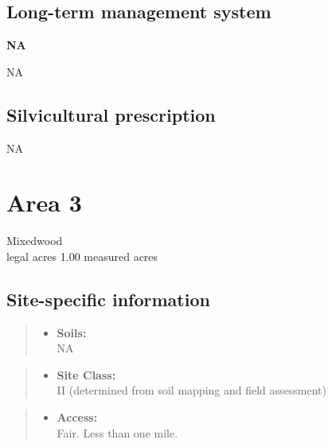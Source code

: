 \documentclass[]{tufte-handout}
\providecommand{\tightlist}{%
  \setlength{\itemsep}{0pt}\setlength{\parskip}{0pt}}
\begin{document}
\subsection{Long-term management
system}\label{long-term-management-system-1}

\textbf{NA}

NA

\subsection{Silvicultural
prescription}\label{silvicultural-prescription-1}

NA

\newpage

\section{Area 3}\label{area-3}

Mixedwood\\
 legal acres \textbar{} 1.00 measured acres

\subsection{Site-specific
information}\label{site-specific-information-2}

\begin{quote}
\begin{itemize}
\tightlist
\item
  \textbf{Soils:}\\
  \indent\indent  NA
\end{itemize}
\end{quote}

\begin{quote}
\begin{itemize}
\tightlist
\item
  \textbf{Site Class:}\\
  \vspace{2pt} II (determined from soil mapping and field assessment)
\end{itemize}
\end{quote}

\begin{quote}
\begin{itemize}
\tightlist
\item
  \textbf{Access:}\\
  \vspace{2pt} Fair. Less than one mile.
\end{itemize}
\end{quote}
\end{document}
